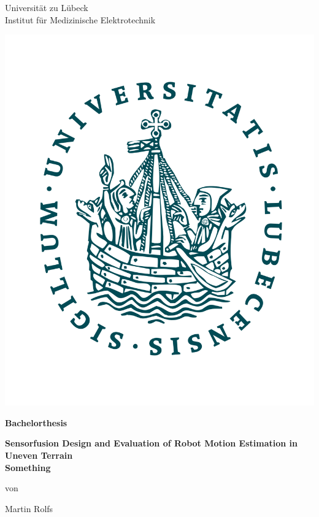\documentclass{article}
\begin{document}
\thispagestyle{empty}
\begin{center}
\LARGE{Universität zu Lübeck}\\[3ex]
\large{Institut für Medizinische Elektrotechnik}\\[2ex]
\end{center}
\medskip

\begin{center}
\includegraphics[scale = 0.18]{images/Logo_Uni_Luebeck_1200dpi.png}
\vspace{1.5cm}

\textbf{\LARGE{Bachelorthesis}}
\medskip\par
\vspace{2cm}

\textbf{\Large{Sensorfusion Design and Evaluation of Robot Motion Estimation in Uneven Terrain}}\\
\textbf{\normalsize{Something}}
\bigskip\par
von \par
\large{Martin Rolfs}
\end{center}
\vspace{1cm}
\end{document}
